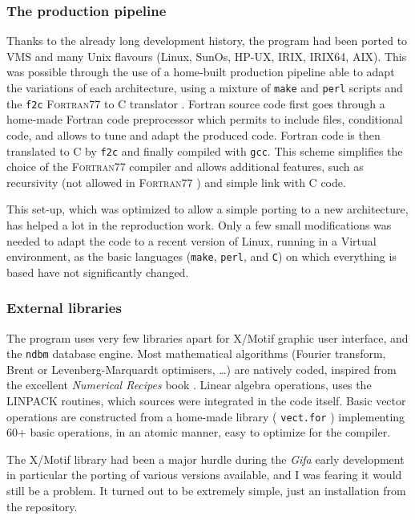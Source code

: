 \hypertarget{the-production-pipeline}{%
\subsubsection{The production pipeline}\label{the-production-pipeline}}

Thanks to the already long development history, the program had been
ported to VMS and many Unix flavours (Linux, SunOs, HP-UX, IRIX, IRIX64,
AIX). This was possible through the use of a home-built production
pipeline able to adapt the variations of each architecture, using a
mixture of \texttt{make} and \texttt{perl} scripts and the \texttt{f2c}
F\textsc{ortran}77 to C translator \cite{f2c}. Fortran source code first
goes through a home-made Fortran code preprocessor which
permits to include files, conditional code, and allows to tune and adapt
the produced code. Fortran code is then translated to C by \texttt{f2c}
and finally compiled with \texttt{gcc}. This scheme simplifies the
choice of the F\textsc{ortran}77 compiler and allows additional
features, such as recursivity (not allowed in F\textsc{ortran}77 ) and
simple link with C code.

This set-up, which was optimized to allow a simple porting to a new
architecture, has helped a lot in the reproduction work. Only a few
small modifications was needed to adapt the code to a recent version of
Linux, running in a Virtual environment, as the basic languages
(\texttt{make}, \texttt{perl}, and \texttt{C}) on which everything is
based have not significantly changed.

\hypertarget{external-libraries}{%
\subsubsection{External libraries}\label{external-libraries}}

The program uses very few libraries apart for X/Motif graphic user
interface, and the \texttt{ndbm} database engine. Most mathematical
algorithms (Fourier transform, Brent or Levenberg-Marquardt optimisers,
\ldots{}) are natively coded, inspired from the excellent
\emph{Numerical Recipes} book \cite{press96}. Linear algebra operations, uses
the LINPACK \cite{linpack} routines, which sources were integrated in
the code itself. Basic vector operations are constructed from a
home-made library ( \texttt{vect.for} ) implementing 60+ basic
operations, in an atomic manner, easy to optimize for the compiler.

The X/Motif library had been a major hurdle during the \emph{Gifa} early
development in particular the porting of various versions available, and
I was fearing it would still be a problem. It turned out to be extremely
simple, just an installation from the repository.

